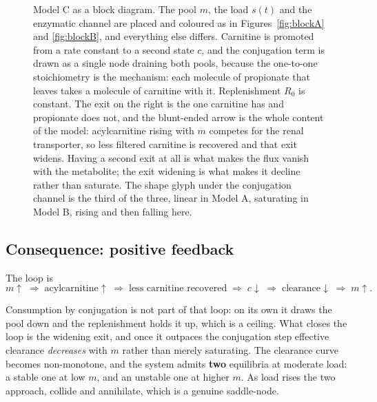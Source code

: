 \begin{figure}[!htbp]
{}
\caption{Model C as a block diagram. The pool $m$, the load $s(t)$ and the enzymatic
channel are placed and coloured as in Figures~\ref{fig:blockA} and \ref{fig:blockB}, and
everything else differs. Carnitine is promoted from a rate constant to a second state $c$,
and the conjugation term is drawn as a single node draining both pools, because the
one-to-one stoichiometry is the mechanism: each molecule of propionate that leaves takes a
molecule of carnitine with it. Replenishment $R_0$ is constant. The exit on the right is the
one carnitine has and propionate does not, and the blunt-ended arrow is the whole content of
the model: acylcarnitine rising with $m$ competes for the renal transporter, so less
filtered carnitine is recovered and that exit widens. Having a second exit at all is what
makes the flux vanish with the metabolite; the exit widening is what makes it decline rather
than saturate. The shape glyph under the conjugation channel is the third of the three,
linear in Model A, saturating in Model B, rising and then falling here.}
\label{fig:blockC}
\end{figure}

\subsection{Consequence: positive feedback}

The loop is
\[
m \uparrow \;\Longrightarrow\; \text{acylcarnitine} \uparrow \;\Longrightarrow\;
\text{less carnitine recovered} \;\Longrightarrow\;
c \downarrow \;\Longrightarrow\; \text{clearance} \downarrow \;\Longrightarrow\; m \uparrow .
\]

Consumption by conjugation is not part of that loop: on its own it draws the pool down and
the replenishment holds it up, which is a ceiling. What closes the loop is the widening exit,
and once it outpaces the conjugation step effective clearance \emph{decreases} with $m$
rather than merely saturating. The clearance curve becomes non-monotone, and the system admits
\textbf{two} equilibria at moderate load: a stable one at low $m$, and an unstable one at
higher $m$. As load rises the two approach, collide and annihilate, which is a genuine
saddle-node.

